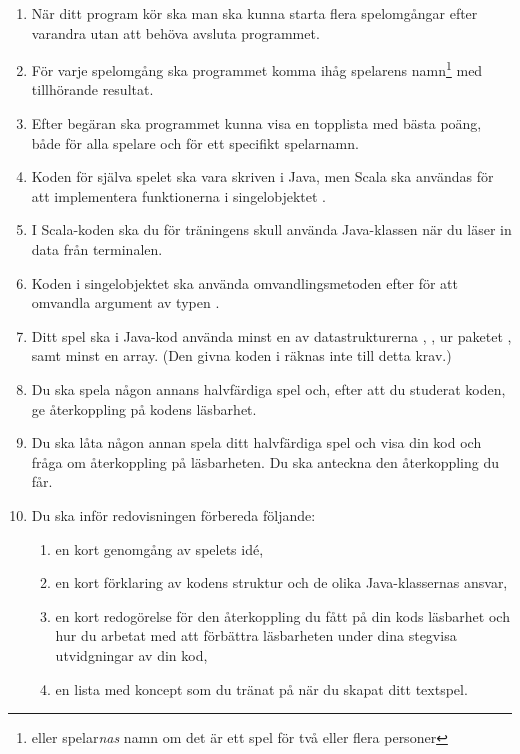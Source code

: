 \begin{enumerate}
  \item När ditt program kör ska man ska kunna starta flera spelomgångar efter varandra utan att behöva avsluta programmet.
  \item För varje spelomgång ska programmet komma ihåg spelarens namn\footnote{eller spelar\emph{nas} namn om det är ett spel för två eller flera personer} med tillhörande resultat.
  \item Efter begäran ska programmet kunna visa en topplista med bästa poäng, både för alla spelare och för ett specifikt spelarnamn.
  \item Koden för själva spelet ska vara skriven i Java, men Scala ska användas för att implementera funktionerna i singelobjektet .
  \item I Scala-koden ska du för träningens skull använda Java-klassen  när du läser in data från terminalen.
  \item Koden i singelobjektet  ska använda omvandlingsmetoden  efter  för att omvandla argument av typen .
  \item Ditt spel ska i Java-kod använda minst en av datastrukturerna
  ,
  ,
   ur paketet , samt minst en array. (Den givna koden i  räknas inte till detta krav.)
  \item Du ska spela någon annans halvfärdiga spel och, efter att du studerat koden, ge återkoppling på kodens läsbarhet.
  \item Du ska låta någon annan spela ditt halvfärdiga spel och visa din kod och fråga om återkoppling på läsbarheten. Du ska anteckna den återkoppling du får.
  \item Du ska inför redovisningen förbereda följande:
  \begin{enumerate}
    \item en kort genomgång av spelets idé,
    \item en kort förklaring av kodens struktur och de olika Java-klassernas ansvar,
    \item en kort redogörelse för den återkoppling du fått på din kods läsbarhet och hur du arbetat med att förbättra läsbarheten under dina stegvisa utvidgningar av din kod,
    \item en lista med koncept som du tränat på när du skapat ditt textspel.
  \end{enumerate}
\end{enumerate}


